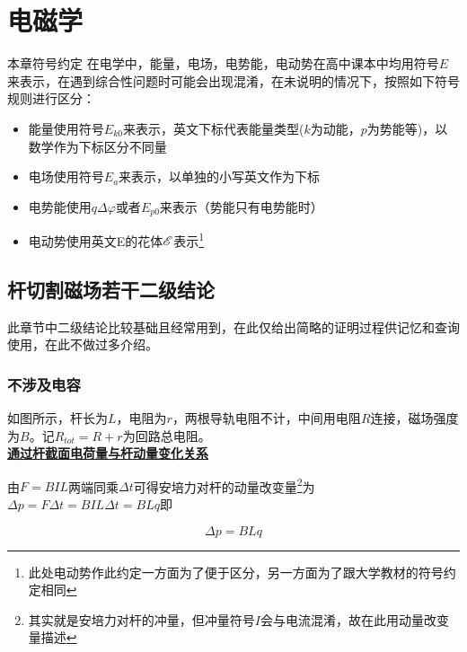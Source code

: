 
\chapter{电磁学}

\begin{mk}{本章符号约定}{}
在电学中，能量，电场，电势能，电动势在高中课本中均用符号$E$来表示，在遇到综合性问题时可能会出现混淆，在未说明的情况下，按照如下符号规则进行区分：

\begin{itemize}
\item 能量使用符号$E_{k0}$来表示，英文下标代表能量类型($k$为动能，$p$为势能等)，以数学作为下标区分不同量
\item 电场使用符号$E_a$来表示，以单独的小写英文作为下标
\item 电势能使用$q \Delta \varphi$或者$E_{p0}$来表示（势能只有电势能时）
\item 电动势使用英文E的花体$\mathscr{E}$表示\footnote{此处电动势作此约定一方面为了便于区分，另一方面为了跟大学教材的符号约定相同}
\end{itemize}
\end{mk}

\section{杆切割磁场若干二级结论}

此章节中二级结论比较基础且经常用到，在此仅给出简略的证明过程供记忆和查询使用，在此不做过多介绍。

\subsection{不涉及电容}

如图所示，杆长为$L$，电阻为$r$，两根导轨电阻不计，中间用电阻$R$连接，磁场强度为$B$。记$R_{tot} = R + r$为回路总电阻。
~\\

\noindent \uline{\textbf{通过杆截面电荷量与杆动量变化关系}}

由$F = BIL$两端同乘$\Delta t$可得安培力对杆的动量改变量\footnote{其实就是安培力对杆的冲量，但冲量符号$I$会与电流混淆，故在此用动量改变量描述}为$\Delta p = F \Delta t = BIL \Delta t = BLq$即

\begin{equation}
\boxed{\Delta p = BLq}
\end{equation}


